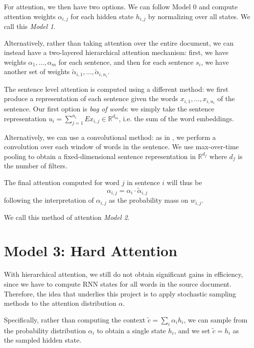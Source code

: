 \documentclass[11pt]{report}
\begin{document}
For attention, we then have two options. We can follow Model 0 and compute attention weights $\alpha_{i,j}$ for each hidden state $h_{i,j}$ by normalizing over all states. We call this \emph{Model 1}.

Alternatively, rather than taking attention over the entire document, we can instead have a two-layered hierarchical attention mechanism: first, we have weights $\alpha_1, \ldots, \alpha_m$ for each sentence, and then for each sentence $s_i$, we have another set of weights $\widetilde{\alpha}_{i,1}, \ldots, \widetilde{\alpha}_{i,n_i}$.

The sentence level attention is computed using a different method: we first produce a representation of each sentence given the words $x_{i,1}, \ldots, x_{i, n_i}$ of the sentence. Our first option is \emph{bag of words}: we simply take the sentence representation $u_i = \sum_{j=1}^{n_i} Ex_{i,j} \in \mathbb{R}^{d_{in}}$, i.e. the sum of the word embeddings.

Alternatively, we can use a convolutional method: as in \cite{kim2014convolutional}, we perform a convolution over each window of words in the sentence. We use max-over-time pooling to obtain a fixed-dimensional sentence representation in $\mathbb{R}^{d_f}$ where $d_f$ is the number of filters.


The final attention computed for word $j$ in sentence $i$ will thus be
$$\alpha_{i,j} = \alpha_i \cdot \widetilde{\alpha}_{i,j}$$
following the interpretation of $\alpha_{i,j}$ as the probability mass on $w_{i,j}$.

We call this method of attention \emph{Model 2}.

\section{Model 3: Hard Attention}

With hierarchical attention, we still do not obtain significant gains in efficiency, since we have to compute RNN states for all words in the source document. Therefore, the idea that underlies this project is to apply stochastic sampling methods to the attention distribution $\alpha$.

Specifically, rather than computing the context $\widetilde{c} = \sum_i \alpha_i h_i$, we can sample from the probability distribution $\alpha_i$ to obtain a single state $h_i$, and we set $\widetilde{c} = h_i$ as the sampled hidden state.
\end{document}
